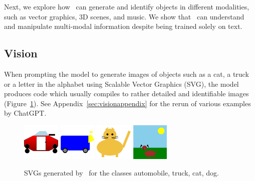 Next, we explore how \DV\ can generate and identify objects in different modalities, such as vector graphics, 3D scenes, and music. We show that \DV\ can understand and manipulate multi-modal information despite being trained solely on text. 

\subsection{Vision}\label{sec:vision}
When prompting the model to generate images of objects such as a cat, a truck or a letter in the alphabet using Scalable Vector Graphics (SVG), the model produces code which usually compiles to rather detailed and identifiable images (Figure~\ref{fig:2d}). See Appendix~\ref{sec:visionappendix} for the rerun of various examples by ChatGPT.

\begin{figure}[ht]
	\centering
	\includegraphics[width=0.16\textwidth]{Section 2/automobile_2d.png}
	\hspace{0.2in}
	\includegraphics[width=0.16\textwidth]{Section 2/truck_2d.png}
	\hspace{0.2in}
	\includegraphics[width=0.16\textwidth]{Section 2/cat_2d.png}
	\hspace{0.2in}
	\includegraphics[width=0.16\textwidth]{Section 2/dog_2d.png}
	\caption{SVGs generated by \DV \ for the classes automobile, truck, cat, dog.}
	\label{fig:2d}
\end{figure}

